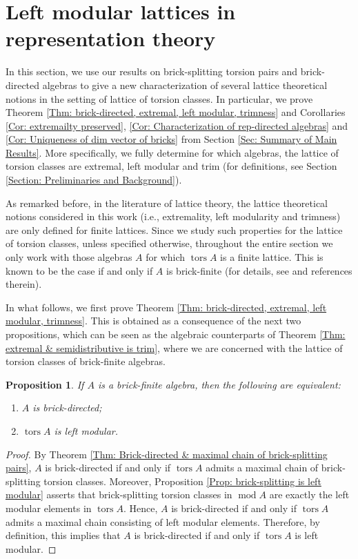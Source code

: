 \documentclass{amsart}
\theoremstyle{thmstyle}
\newtheorem{proposition}[thm]{Proposition}
\theoremstyle{exstyle}
\theoremstyle{defstyle}
\theoremstyle{remstyle}
\theoremstyle{remstyle}
\DeclareMathOperator*{\modu}{mod}
\DeclareMathOperator*{\tors}{tors}
\begin{document}
\section{Left modular lattices in representation theory}\label{Section: Trim lattices in representation theory}
In this section, we use our results on brick-splitting torsion pairs and brick-directed algebras to give a new characterization of several lattice theoretical notions in the setting of lattice of torsion classes. In particular, we prove Theorem \ref{Thm: brick-directed, extremal, left modular, trimness} and Corollaries \ref{Cor: extremailty preserved}, \ref{Cor: Characterization of rep-directed algebras} and \ref{Cor: Uniqueness of dim vector of bricks} from Section \ref{Sec: Summary of Main Results}. More specifically, we fully determine for which algebras, the lattice of torsion classes are extremal, left modular and trim (for definitions, see Section \ref{Section: Preliminaries and Background}).

As remarked before, in the literature of lattice theory, the lattice theoretical notions considered in this work (i.e., extremality, left modularity and trimness) are only defined for finite lattices. Since we study such properties for the lattice of torsion classes, unless specified otherwise, throughout the entire section we only work with those algebras $A$ for which $\tors A$ is a finite lattice. This is known to be the case if and only if $A$ is brick-finite (for details, see \cite{DIJ} and references therein).

In what follows, we first prove Theorem \ref{Thm: brick-directed, extremal, left modular, trimness}. This is obtained as a consequence of the next two propositions, which can be seen as the algebraic counterparts of Theorem \ref{Thm: extremal & semidistributive is trim}, where we are concerned with the lattice of torsion classes of brick-finite algebras. 


\begin{proposition}\label{Prop: brick-directed equiv. left modular}
If $A$ is a brick-finite algebra, then the following are equivalent:
\begin{enumerate}
    \item $A$ is brick-directed;
    \item $\tors A$ is left modular.
\end{enumerate}
\end{proposition}
\begin{proof}
By Theorem \ref{Thm: Brick-directed & maximal chain of brick-splitting pairs}, $A$ is brick-directed if and only if $\tors A$ admits a maximal chain of brick-splitting torsion classes. Moreover, Proposition \ref{Prop: brick-splitting is left modular} asserts that brick-splitting torsion classes in $\modu A$ are exactly the left modular elements in $\tors A$. Hence, $A$ is brick-directed if and only if $\tors A$ admits a maximal chain consisting of left modular elements. Therefore, by definition, this implies that $A$ is brick-directed if and only if $\tors A$ is left modular.
\end{proof}
\end{document}
